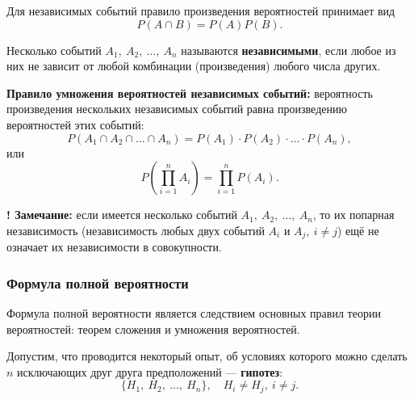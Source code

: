 \documentclass[a4paper]{article}
\newcommand{\key}[1]{{\bfseries\color{Medium} #1}}
\newcommand{\note}{{\bfseries\color{Dark} {\Large !} Замечание: \newline}}
\begin{document}
                Для независимых событий правило произведения вероятностей принимает вид
                \begin{equation*}
                    P(A \cap B) = P(A) P(B) .
                \end{equation*}

                Несколько событий $A_1 , \: A_2 , \: \ldots , \: A_n$ называются \key{независимыми}, если любое из них не зависит от любой комбинации (произведения) любого числа других.
                
                \key{Правило умножения вероятностей независимых событий:} \newline
                вероятность произведения нескольких независимых событий равна произведению вероятностей этих событий:
                \begin{equation*}
                    P(A_1 \cap A_2 \cap \ldots \cap A_n) =
                        P(A_1) \cdot P(A_2) \cdot \ldots \cdot P(A_n) ,
                \end{equation*}
                или
                \begin{equation*}
                    P \left( \prod\limits_{i = 1}^{n} A_i \right) = \prod\limits_{i = 1}^{n} P(A_i) .
                \end{equation*}

                \note
                если имеется несколько событий $A_1 , \: A_2 , \: \ldots , \: A_n$, то их попарная независимость (независимость любых двух событий $A_i \text{ и } A_j , \: i \neq j$) ещё не означает их независимости в совокупности.

            \subsubsection{Формула полной вероятности}

                Формула полной вероятности является следствием основных правил теории вероятностей: теорем сложения и умножения вероятностей.

                Допустим, что проводится некоторый опыт, об условиях которого можно сделать $n$ исключающих друг друга предположений --- \key{гипотез}:
                \begin{equation*}
                    \{ H_1 , \: H_2 , \: \ldots , \: H_n \} , \quad H_i \neq H_j , \: i \neq j .
                \end{equation*}
\end{document}
